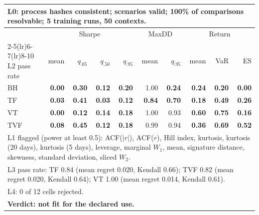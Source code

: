 \begin{tabular}{lrrrrrrrrr}
\toprule
\multicolumn{10}{p{13.5cm}}{L0: process hashes consistent; scenarios valid; 100\% of comparisons resolvable; 5 training runs, 50 contexts.} \\
\midrule
 & \multicolumn{4}{c}{Sharpe} & \multicolumn{2}{c}{MaxDD} & \multicolumn{3}{c}{Return} \\
\cmidrule(lr){2-5}\cmidrule(lr){6-7}\cmidrule(lr){8-10}
L2 pass rate & mean & $q_{.05}$ & $q_{.50}$ & $q_{.95}$ & mean & $q_{.95}$ & mean & VaR & ES \\
\midrule
BH & \textbf{0.00} & \textbf{0.30} & \textbf{0.12} & \textbf{0.20} & 1.00 & \textbf{0.24} & \textbf{0.24} & \textbf{0.20} & \textbf{0.00} \\
TF & \textbf{0.03} & \textbf{0.41} & \textbf{0.03} & \textbf{0.12} & \textbf{0.84} & \textbf{0.70} & \textbf{0.18} & \textbf{0.49} & \textbf{0.26} \\
VT & \textbf{0.00} & \textbf{0.12} & \textbf{0.14} & \textbf{0.18} & 1.00 & 0.93 & \textbf{0.60} & \textbf{0.75} & \textbf{0.16} \\
TVF & \textbf{0.08} & \textbf{0.45} & \textbf{0.12} & \textbf{0.18} & 0.99 & 0.94 & \textbf{0.36} & \textbf{0.69} & \textbf{0.52} \\
\midrule
\multicolumn{10}{p{13.5cm}}{L1 flagged (power at least 0.5): ACF($|r|$), ACF($r$), Hill index, kurtosis, kurtosis (20 days), kurtosis (5 days), leverage, marginal $W_1$, mean, signature distance, skewness, standard deviation, sliced $W_2$.} \\
\multicolumn{10}{p{13.5cm}}{L3 pass rate: TF 0.84 (mean regret 0.020, Kendall 0.66); TVF 0.82 (mean regret 0.020, Kendall 0.64); VT 1.00 (mean regret 0.014, Kendall 0.61).} \\
\multicolumn{10}{p{13.5cm}}{L4: 0 of 12 cells rejected.} \\
\multicolumn{10}{p{13.5cm}}{\textbf{Verdict: not fit for the declared use.}} \\
\bottomrule
\end{tabular}
